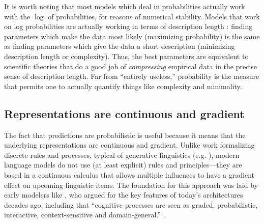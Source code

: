 \documentclass[output=paper,colorlinks,citecolor=brown
]{langscibook}
\begin{document}
It is worth noting that most models which deal in probabilities actually work with the $\log$ of probabilities, for reasons of numerical stability. Models that work on log probabilities are actually working in terms of description length \citep{shannon1948mathematical,cover1999elements}: finding parameters which make the data most likely (maximizing probability) is the same as finding parameters which give the data a short description (minimizing description length or complexity). Thus, the best parameters are equivalent to scientific theories that do a good job of \emph{compressing} empirical data in the precise sense of description length. Far from ``entirely useless,'' probability is the measure that permits one to actually quantify things like complexity and minimality. 

\subsection*{Representations are continuous and gradient}

The fact that predictions are probabilistic is useful because it means that the underlying representations are continuous and gradient. Unlike work formalizing discrete rules and processes, typical of generative linguistics (e.g. \cite{chomsky1956three,chomsky1995minimalist,collins2016formalization,chomsky1957syntactic,pinker1988language}), modern language models do not use (at least explicit) rules and principles---they are based in a continuous calculus that allows multiple influences to have a gradient effect on upcoming linguistic items. The foundation for this approach was laid by early modelers like \cite{rumelhart1986learning}, who argued for the key features of today's architectures decades ago, including that ``cognitive processes are seen as graded, probabilistic, interactive, context-sensitive and domain-general.'' \citep{mcclelland2002rules}. 
\end{document}
